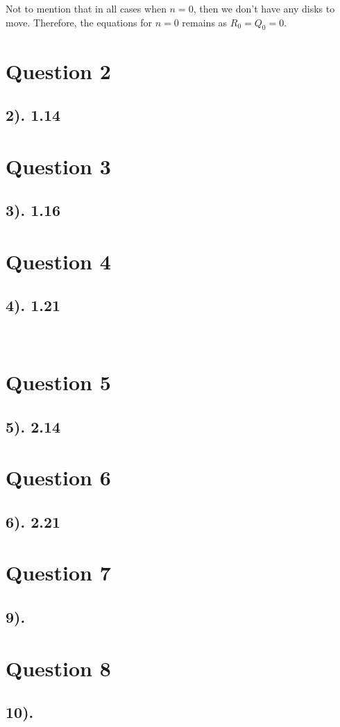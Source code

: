 \documentclass[12pt]{article}
\begin{document}
Not to mention that in all cases when $n=0$, then we don't have any disks to move. Therefore, the equations for $n=0$ remains as $R_{0}=Q_{0}=0$.

\section*{Question 2}
\subsection*{2). 1.14}

\section*{Question 3}
\subsection*{3). 1.16}

\section*{Question 4}
\subsection*{4). 1.21}
\
\section*{Question 5}
\subsection*{5). 2.14}

\section*{Question 6}
\subsection*{6). 2.21}

\section*{Question 7}
\subsection*{9).}

\section*{Question 8}
\subsection*{10).}
\end{document}
